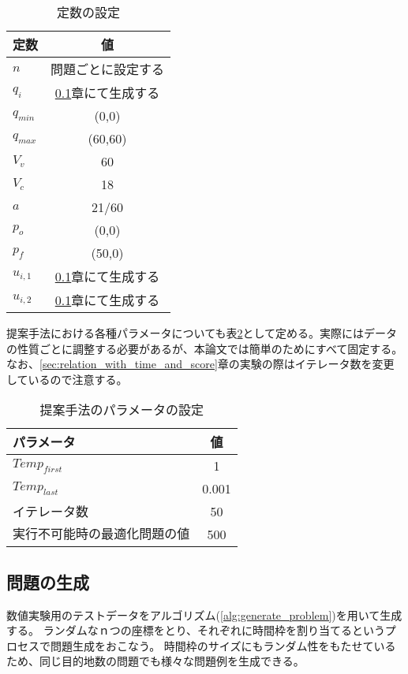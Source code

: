 \documentclass[11pt,a4paper,dvipdfmx,titlepage,uplatex]{jsarticle}
\theoremstyle{mystyle}
\newcommand{\0}{\mathbf{0}}
\begin{document}
	\begin{table}[htbp]
		\centering
		\caption{定数の設定}
		\begin{tabular}{|l|c|}
			\hline
			定数 & 値  \\ \hline\hline
			$n$ & 問題ごとに設定する  \\
			$q_i$ & \ref{sec:Problem_Generation}章にて生成する  \\ 
			$q_{min}$ & (0,0)  \\
			$q_{max}$ & (60,60) \\
			$V_v$ & 60 \\
			$V_c$ & 18\\
			$a$ & 21/60  \\
			$p_o$ & (0,0)  \\
			$p_f$ & (50,0)  \\
			$u_{i,1}$ & \ref{sec:Problem_Generation}章にて生成する  \\
			$u_{i,2}$ & \ref{sec:Problem_Generation}章にて生成する  \\ \hline 
		\end{tabular}
		\label{tb:constan_setting}
	\end{table}
	
	提案手法における各種パラメータについても表\ref{tb:approach_parameta}として定める。実際にはデータの性質ごとに調整する必要があるが、本論文では簡単のためにすべて固定する。なお、\ref{sec:relation_with_time_and_score}章の実験の際はイテレータ数を変更しているので注意する。
	\begin{table}[htbp]
		\centering
		\caption{提案手法のパラメータの設定}
		\begin{tabular}{|l|c|}
			\hline
			パラメータ & 値  \\ \hline\hline
			$Temp_{first}$ & 1  \\
			$Temp_{last}$ & 0.001  \\ 
			$イテレータ数$ & 50 \\
			$実行不可能時の最適化問題の値$ & 500 \\ \hline
		\end{tabular}
		\label{tb:approach_parameta}
	\end{table}
	
	\subsection{問題の生成}\label{sec:Problem_Generation}
	数値実験用のテストデータをアルゴリズム(\ref{alg:generate_problem})を用いて生成する。
	ランダムなｎつの座標をとり、それぞれに時間枠を割り当てるというプロセスで問題生成をおこなう。
	時間枠のサイズにもランダム性をもたせているため、同じ目的地数の問題でも様々な問題例を生成できる。
	
\end{document}
